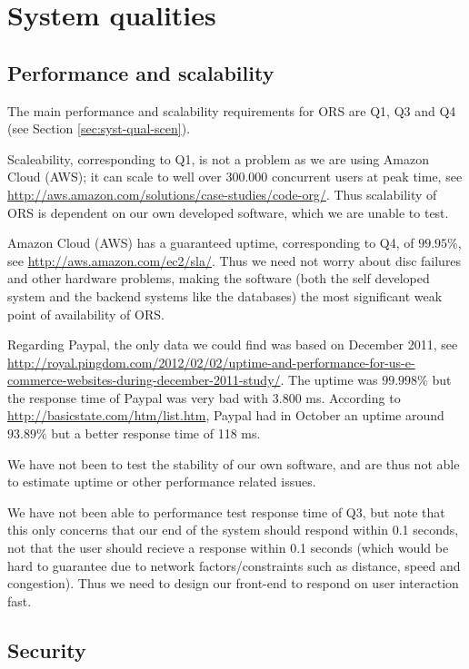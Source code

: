 \chapter{System qualities}
\label{cha:system-qualities}
\thispagestyle{fancy}


\section{Performance and scalability}
\label{sec:perf-scal}
The main performance and scalability requirements for ORS are Q1, Q3 and Q4 (see Section \ref{sec:syst-qual-scen}).

Scaleability, corresponding to Q1, is not a problem as we are using Amazon Cloud (AWS); it can scale to well over 300.000 concurrent users at peak time, see \url{http://aws.amazon.com/solutions/case-studies/code-org/}. Thus scalability of ORS is dependent on our own developed software, which we are unable to test.

Amazon Cloud (AWS) has a guaranteed uptime, corresponding to Q4, of $99.95\%$, see \url{http://aws.amazon.com/ec2/sla/}. Thus we need not worry about disc failures and other hardware problems, making the software (both the self developed system and the backend systems like the databases) the most significant weak point of availability of ORS.

Regarding Paypal, the only data we could find was based on December 2011, see \url{http://royal.pingdom.com/2012/02/02/uptime-and-performance-for-us-e-commerce-websites-during-december-2011-study/}. The uptime was $99.998\%$ but the response time of Paypal was very bad with 3.800 ms. According to \url{http://basicstate.com/htm/list.htm}, Paypal had in October an uptime around $93.89\%$ but a better response time of 118 ms.

We have not been to test the stability of our own software, and are thus not able to estimate uptime or other performance related issues.

We have not been able to performance test response time of Q3, but note that this only concerns that our end of the system should respond within 0.1 seconds, not that the user should recieve a response within 0.1 seconds (which would be hard to guarantee due to network factors/constraints such as distance, speed and congestion). Thus we need to design our front-end to respond on user interaction fast.


\section{Security}
\label{sec:security}

